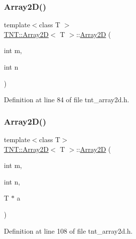 \mbox{\label{classTNT_1_1Array2D_a80990fd85f6c04956a247d43d23a6af4}} 
\subsubsection{\texorpdfstring{Array2\+D()}{Array2D()}\hspace{0.1cm}{\footnotesize\ttfamily [2/5]}}
{\footnotesize\ttfamily template$<$class T $>$ \\
\hyperlink{classTNT_1_1Array2D}{T\+N\+T\+::\+Array2D}$<$ T $>$\+::\hyperlink{classTNT_1_1Array2D}{Array2D} (\begin{DoxyParamCaption}\item[{int}]{m,  }\item[{int}]{n }\end{DoxyParamCaption})}



Definition at line 84 of file tnt\+\_\+array2d.\+h.

\mbox{\label{classTNT_1_1Array2D_a7447ecfb709ce78db3c78ff21104f6f2}} 
\subsubsection{\texorpdfstring{Array2\+D()}{Array2D()}\hspace{0.1cm}{\footnotesize\ttfamily [3/5]}}
{\footnotesize\ttfamily template$<$class T$>$ \\
\hyperlink{classTNT_1_1Array2D}{T\+N\+T\+::\+Array2D}$<$ T $>$\+::\hyperlink{classTNT_1_1Array2D}{Array2D} (\begin{DoxyParamCaption}\item[{int}]{m,  }\item[{int}]{n,  }\item[{T $\ast$}]{a }\end{DoxyParamCaption})}



Definition at line 108 of file tnt\+\_\+array2d.\+h.

\mbox{\label{classTNT_1_1Array2D_a0bbed4288ef81ee0c9baabf69c824191}} 
